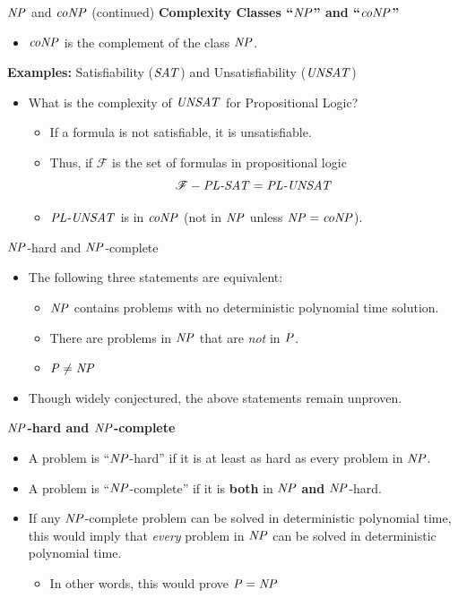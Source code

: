 \documentclass[style=sailor,size=12pt]{powerdot}
\begin{document}
\begin{wideslide}[bm=,toc=]{$\mbox{\it NP\/}$ and $\mbox{\it coNP\/}$ (continued)}
{\bf Complexity Classes ``$\mbox{\it NP\/}$'' and ``$\mbox{\it coNP\/}$''}
\begin{itemize}
\item $\mbox{\it coNP\/}$ is the complement of the class $\mbox{\it NP\/}$.
\end{itemize}
{\bf Examples:} Satisfiability ($\mbox{\it SAT\/}$) and Unsatisfiability ($\mbox{\it UNSAT\/}$) 
\begin{itemize}
\item<2-> What is the complexity of $\mbox{\it UNSAT\/}$ for Propositional Logic?
\begin{itemize}
\item<3-> If a formula is not satisfiable, it is unsatisfiable.
\item<3-> Thus, if $\mathcal{F}$ is the set of formulas in propositional logic
\pause[3]
  \[
    \mathcal{F} - \mbox{\it PL-SAT\/} = \mbox{\it PL-UNSAT\/}
  \]
  \vspace{-5mm}
\item<5->  $\mbox{\it PL-UNSAT\/}$ is in $\mbox{\it coNP\/}$ (not in $\mbox{\it NP\/}$ unless
    $\mbox{\it NP\/}=\mbox{\it coNP\/}$).
\end{itemize}
\end{itemize}
\end{wideslide}



\begin{wideslide}[bm=,toc=]{$\mbox{\it NP\/}$-hard and $\mbox{\it NP\/}$-complete}
\begin{itemize}
\item The following three statements are equivalent: 
\begin{itemize}
\item $\mbox{\it NP\/}$ contains problems with no deterministic polynomial time
solution.
\item There are problems in $\mbox{\it NP\/}$ that are \emph{not} in $\mbox{\it P\/}$.
\item $\mbox{\it P\/} \neq  \mbox{\it NP\/}$
\end{itemize}
\item Though widely conjectured, the above statements remain unproven.
\end{itemize}
\textbf{$\mbox{\it NP\/}$-hard and $\mbox{\it NP\/}$-complete}
\begin{itemize}
\item A problem is ``$\mbox{\it NP\/}$-hard'' if it is at least as hard as
every problem in $\mbox{\it NP\/}$.
\item A problem is ``$\mbox{\it NP\/}$-complete'' if it is \textbf{both} in $\mbox{\it NP\/}$ \textbf{and} $\mbox{\it NP\/}$-hard.
\item If any $\mbox{\it NP\/}$-complete problem can be solved in deterministic
polynomial time, this would imply that {\em every\/}
problem in $\mbox{\it NP\/}$ can be solved in deterministic polynomial time.
\begin{itemize}
\item In other words, this would prove $\mbox{\it P\/} = \mbox{\it NP\/}$
\end{itemize}
\end{itemize}
\end{wideslide}
\end{document}
